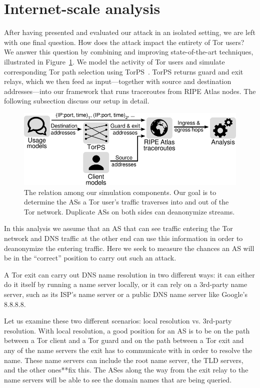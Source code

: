 \section{Internet-scale analysis}
\label{sec:internet-scale}
After having presented and evaluated our attack in an isolated setting, we are
left with one final question.  How does the attack impact the entirety of Tor
users?  We answer this question by combining and improving state-of-the-art
techniques, illustrated in Figure~\ref{fig:simulations}.  We model the activity
of Tor users and simulate corresponding Tor path selection using
TorPS~\cite{TorPS}.  TorPS returns guard and exit relays, which we then feed as
input---together with source and destination addresses---into our framework that
runs traceroutes from RIPE Atlas nodes.  The following subsection discuss our
setup in detail.

\begin{figure}[t]
	\centering
	\includegraphics[width=\linewidth]{figures/simulations.pdf}
	\caption{The relation among our simulation components.  Our goal is to
	determine the ASs a Tor user's traffic traverses into and out of the Tor
	network.  Duplicate ASs on both sides can deanonymize streams.}
	\label{fig:simulations}
\end{figure}

In this analysis we assume that an AS that can see traffic entering the Tor network and 
DNS traffic at the other end can use this information in order to deanonymize the 
entering traffic. Here we seek to measure the chances an AS will be in the ``correct'' 
position to carry out such an attack.

A Tor exit can carry out DNS name resolution in two different ways: it can either do it
itself by running a name server locally, or it can rely on a 3rd-party name server, 
such as its ISP's name server or a public DNS name server like Google's 8.8.8.8.

Let us examine these two different scenarios: local resolution vs. 3rd-party 
resolution. With local resolution, a good position for an AS is to be on the path between 
a Tor client and a Tor guard and on the path between a Tor exit and any of the name 
servers the exit has to communicate with in order to resolve the name. These name servers 
can include the root name server, the TLD servers, and the other ones**fix this. The ASes 
along the way from the exit relay to the name servers will be able to see the domain 
names that are being queried.

